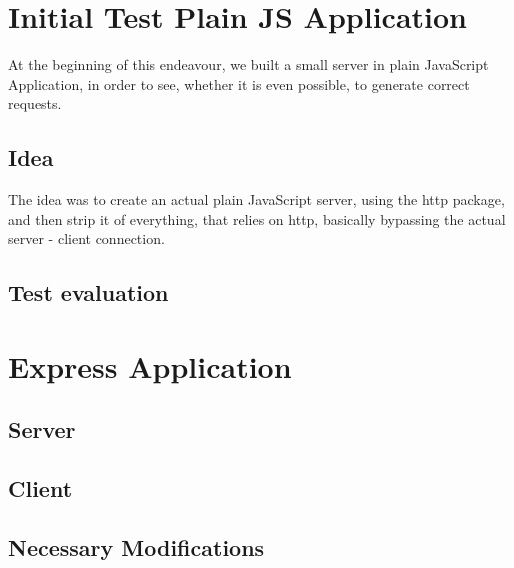 \section{Initial Test Plain JS Application}

At the beginning of this endeavour, we built a small server in plain JavaScript Application, in order to see, whether it is even possible, to generate correct requests.

\subsection{Idea}

The idea was to create an actual plain JavaScript server, using the http package, and then strip it of everything, that relies on http, basically bypassing the actual server - client connection. 
\subsection{Test evaluation}
\section{Express Application}
\subsection{Server}
\subsection{Client}
\subsection{Necessary Modifications}
